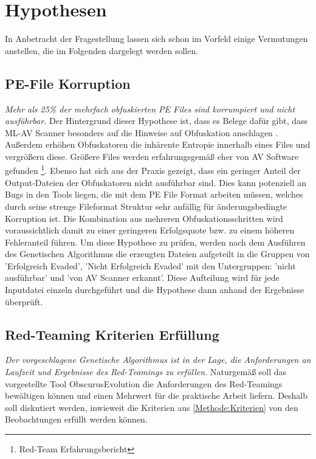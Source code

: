 
\section{Hypothesen}
\label{Sec:Hypothesen}
In Anbetracht der Fragestellung lassen sich schon im Vorfeld einige Vermutungen anstellen, die im Folgenden dargelegt werden sollen.
\subsection{PE-File Korruption} 
\textit{Mehr als 25\% der mehrfach obfuskierten PE Files sind korrumpiert und nicht ausführbar.} 
Der Hintergrund dieser Hypothese ist, dass es Belege dafür gibt, dass ML-AV Scanner besonders auf die Hinweise auf Obfuskation anschlagen \cite{nunes_2022_bane}. Außerdem erhöhen Obfuskatoren die inhärente Entropie innerhalb eines Files und vergrößern diese. Größere Files werden erfahrungsgemäß eher von AV Software gefunden \footnote{Red-Team Erfahrungsbericht}. Ebenso hat sich aus der Praxis gezeigt, dass ein geringer Anteil der Output-Dateien der Obfuskatoren nicht ausführbar sind.
Dies kann potenziell an Bugs in den Tools liegen, die mit dem PE File Format arbeiten müssen, welches durch seine strenge Fileformat Struktur sehr anfällig für änderungsbedingte Korruption ist. Die Kombination aus mehreren Obfuskationsschritten wird voraussichtlich damit zu einer geringeren Erfolgsquote bzw. zu einem höheren Fehleranteil führen.
Um diese Hypothese zu prüfen, werden nach dem Ausführen des Genetischen Algorithmus die erzeugten Dateien aufgeteilt in die Gruppen von 'Erfolgreich Evaded', 'Nicht Erfolgreich Evaded' mit den Untergruppen: 'nicht ausführbar' und 'von AV Scanner erkannt'. Diese Aufteilung wird für jede Inputdatei einzeln durchgeführt und die Hypothese dann anhand der Ergebnisse überprüft.
\subsection{Red-Teaming Kriterien Erfüllung}
\textit{Der vorgeschlagene Genetische Algorithmus ist in der Lage, die Anforderungen an Laufzeit und Ergebnisse des Red-Teamings zu erfüllen.}
Naturgemäß soll das vorgestellte Tool ObscurusEvolution die Anforderungen des Red-Teamings bewältigen können und einen Mehrwert für die praktische Arbeit liefern. Deshalb soll diskutiert werden, inwieweit die Kriterien aus \ref{Methode:Kriterien} von den Beobachtungen erfüllt werden können.
